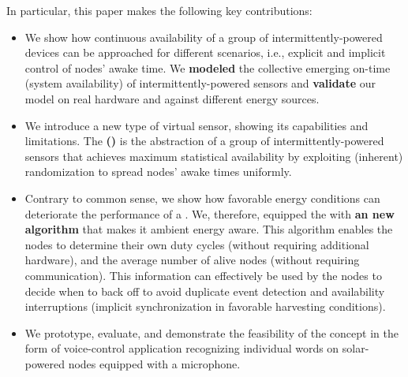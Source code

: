 
In particular, this paper makes the following key contributions:
\begin{itemize}
		\item We show how continuous availability of a group of intermittently-powered devices can be approached for different scenarios, i.e., explicit and implicit control of nodes' awake time. 
		We \textbf{modeled} the collective emerging on-time (system availability) of intermittently-powered sensors and \textbf{validate} our model on real hardware and against different energy sources. 
		\item We introduce a new type of virtual sensor, showing its capabilities and limitations. The \textbf{\fullsys (\sys)} is the abstraction of a group of intermittently-powered sensors that achieves maximum statistical availability by exploiting (inherent) randomization to spread nodes' awake times uniformly.
		\item Contrary to common sense, we show how favorable energy conditions can deteriorate the performance of a \sys. We, therefore, equipped the \sys with \textbf{an new algorithm} that makes it ambient energy aware.
		This algorithm enables the nodes to determine their own duty cycles (without requiring additional hardware),
		and the average number of alive nodes (without requiring communication). This information can effectively be used by the nodes to decide when to back off to avoid duplicate event detection and availability interruptions (implicit synchronization in favorable harvesting conditions).

		\item We prototype, evaluate, and demonstrate the feasibility of the \fullsys concept in the form of voice-control application recognizing individual words on solar-powered nodes equipped with a microphone.
\end{itemize}


